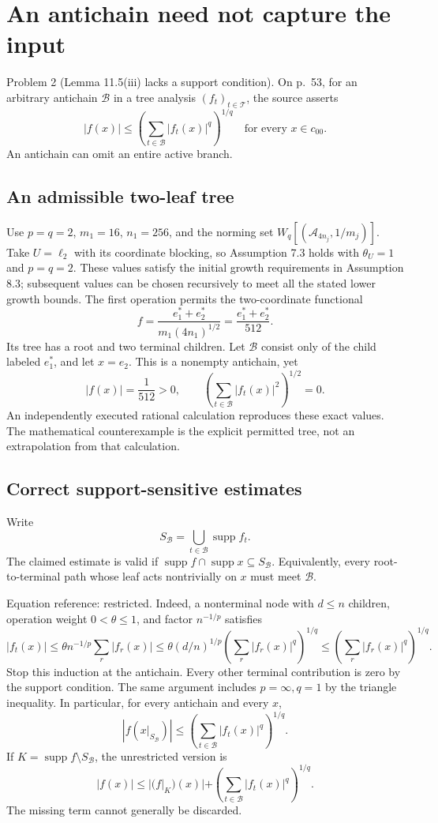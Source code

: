\documentclass[10pt]{article}
\begin{document}
\section*{An antichain need not capture the input}
Problem 2 (Lemma 11.5(iii) lacks a support condition).  On p. 53, for an arbitrary antichain \(\mathcal B\) in a tree analysis \((f_t)_{t\in\mathcal T}\), the source asserts \[|f(x)|\leq
 \left(\sum_{t\in\mathcal B}|f_t(x)|^q\right)^{1/q}
 \quad\text{for every }x\in c_{00}.\] An antichain can omit an entire active branch.\par
\subsection*{An admissible two-leaf tree}
Use \(p=q=2\), \(m_1=16\), \(n_1=256\), and the norming set \(W_q[(\mathcal A_{4n_j},1/m_j)]\). Take \(U=\ell_2\) with its coordinate blocking, so Assumption 7.3 holds with \(\theta_U=1\) and \(p=q=2\). These values satisfy the initial growth requirements in Assumption 8.3; subsequent values can be chosen recursively to meet all the stated lower growth bounds. The first operation permits the two-coordinate functional \[f=\frac{e_1^*+e_2^*}{m_1(4n_1)^{1/2}}
   =\frac{e_1^*+e_2^*}{512}.\] Its tree has a root and two terminal children. Let \(\mathcal B\) consist only of the child labeled \(e_1^*\), and let \(x=e_2\). This is a nonempty antichain, yet \[|f(x)|=\frac1{512}>0,\qquad
 \left(\sum_{t\in\mathcal B}|f_t(x)|^2\right)^{1/2}=0.\] An independently executed rational calculation reproduces these exact values. The mathematical counterexample is the explicit permitted tree, not an extrapolation from that calculation.\par
\subsection*{Correct support-sensitive estimates}
Write \[S_{\mathcal B}=\bigcup_{t\in\mathcal B}\operatorname{supp}f_t.\] The claimed estimate is valid if \(\operatorname{supp}f\cap\operatorname{supp}x\subseteq S_{\mathcal B}\). Equivalently, every root-to-terminal path whose leaf acts nontrivially on \(x\) must meet \(\mathcal B\).\par
Equation reference: restricted. Indeed, a nonterminal node with \(d\leq n\) children, operation weight \(0<\theta\leq1\), and factor \(n^{-1/p}\) satisfies \[|f_t(x)|
 \leq\theta n^{-1/p}\sum_r|f_r(x)|
 \leq\theta(d/n)^{1/p}
      \left(\sum_r|f_r(x)|^q\right)^{1/q}
 \leq\left(\sum_r|f_r(x)|^q\right)^{1/q}.\] Stop this induction at the antichain. Every other terminal contribution is zero by the support condition. The same argument includes \(p=\infty,q=1\) by the triangle inequality. In particular, for every antichain and every \(x\), \[
 \left|f(x|_{S_{\mathcal B}})\right|
 \leq\left(\sum_{t\in\mathcal B}|f_t(x)|^q\right)^{1/q}.\] If \(K=\operatorname{supp}f\setminus S_{\mathcal B}\), the unrestricted version is \[|f(x)|\leq |(f|_K)(x)|
       +\left(\sum_{t\in\mathcal B}|f_t(x)|^q\right)^{1/q}.\] The missing term cannot generally be discarded.\par
\end{document}
